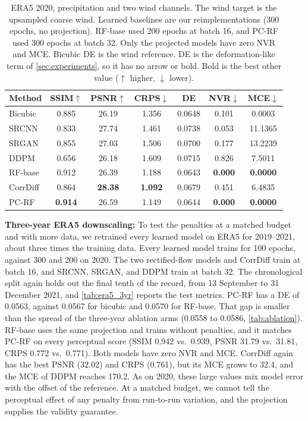 \documentclass[sigconf,nonacm]{acmart}
\newcommand{\pcrf}{\textsc{PC-RF}\xspace}
\begin{document}
\begin{table}[t]
\caption{ERA5 2020, precipitation and two wind channels. The wind target is the upsampled coarse wind. Learned baselines are our reimplementations (300 epochs, no projection). RF-base used 200 epochs at batch 16, and \pcrf used 300 epochs at batch 32. Only the projected models have zero NVR and MCE. Bicubic DE is the wind reference. DE is the deformation-like term of \cref{sec:experiments}, so it has no arrow or bold. Bold is the best other value ($\uparrow$ higher, $\downarrow$ lower).}
\label{tab:era5}
\centering
\small
\begin{tabular}{lcccccc}
\toprule
\textbf{Method} & SSIM$\uparrow$ & PSNR$\uparrow$ & CRPS$\downarrow$ & DE & NVR$\downarrow$ & MCE$\downarrow$ \\
\midrule
Bicubic & 0.885 & 26.19 & 1.356 & 0.0648 & 0.101 & 0.0003 \\
SRCNN & 0.833 & 27.74 & 1.461 & 0.0738 & 0.053 & 11.1365 \\
SRGAN & 0.855 & 27.03 & 1.506 & 0.0700 & 0.177 & 13.2239 \\
DDPM & 0.656 & 26.18 & 1.609 & 0.0715 & 0.826 & 7.5011 \\
RF-base & 0.912 & 26.39 & 1.188 & 0.0643 & \textbf{0.000} & \textbf{0.0000} \\
CorrDiff & 0.864 & \textbf{28.38} & \textbf{1.092} & 0.0679 & 0.451 & 6.4835 \\
PC-RF & \textbf{0.914} & 26.59 & 1.149 & 0.0644 & \textbf{0.000} & \textbf{0.0000} \\
\bottomrule
\end{tabular}
\end{table}

\textbf{Three-year ERA5 downscaling:} To test the penalties at a matched budget and with more data, we retrained every learned model on ERA5 for 2019--2021, about three times the training data. Every learned model trains for 100 epochs, against 300 and 200 on 2020. The two rectified-flow models and CorrDiff train at batch 16, and SRCNN, SRGAN, and DDPM train at batch 32. The chronological split again holds out the final tenth of the record, from 13 September to 31 December 2021, and \cref{tab:era5_3yr} reports the test metrics. \pcrf has a DE of 0.0563, against 0.0567 for bicubic and 0.0570 for RF-base. That gap is smaller than the spread of the three-year ablation arms (0.0558 to 0.0586, \cref{tab:ablation}). RF-base uses the same projection and trains without penalties, and it matches \pcrf on every perceptual score (SSIM 0.942 vs.\ 0.939, PSNR 31.79 vs.\ 31.81, CRPS 0.772 vs.\ 0.771). Both models have zero NVR and MCE. CorrDiff again has the best PSNR (32.02) and CRPS (0.761), but its MCE grows to 32.4, and the MCE of DDPM reaches 170.2. As on 2020, these large values mix model error with the offset of the reference. At a matched budget, we cannot tell the perceptual effect of any penalty from run-to-run variation, and the projection supplies the validity guarantee.
\end{document}
